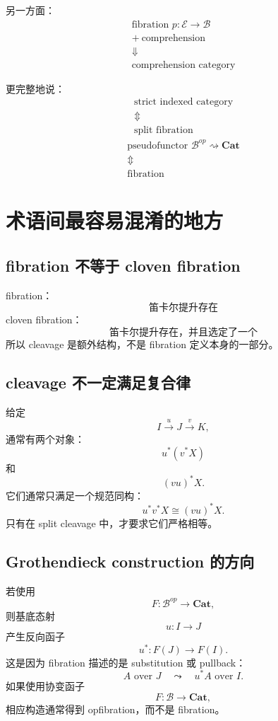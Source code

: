 \documentclass[12pt,a4paper]{article}
\begin{document}
另一方面：
\[
\begin{array}{c}
\text{fibration }p:\mathcal{E}\to\mathcal{B}
\\[2mm]
+\ \text{comprehension}
\\[2mm]
\Downarrow
\\[2mm]
\text{comprehension category}
\end{array}
\]

更完整地说：
\[
\begin{array}{c}
\text{strict indexed category}
\\
\Updownarrow
\\
\text{split fibration}
\end{array}
\]
\[
\begin{array}{c}
\text{pseudofunctor }\mathcal{B}^{op}\rightsquigarrow\mathbf{Cat}
\\
\Updownarrow
\\
\text{fibration}
\end{array}
\]

\section{术语间最容易混淆的地方}

\subsection{fibration 不等于 cloven fibration}
fibration：
\[
\text{笛卡尔提升存在}
\]
cloven fibration：
\[
\text{笛卡尔提升存在，并且选定了一个}
\]
所以 cleavage 是额外结构，不是 fibration 定义本身的一部分。

\subsection{cleavage 不一定满足复合律}
给定
\[
I\xrightarrow{u}J\xrightarrow{v}K,
\]
通常有两个对象：
\[
u^*(v^*X)
\]
和
\[
(vu)^*X.
\]
它们通常只满足一个规范同构：
\[
u^*v^*X\cong(vu)^*X.
\]
只有在 split cleavage 中，才要求它们严格相等。

\subsection{Grothendieck construction 的方向}
若使用
\[
F:\mathcal{B}^{op}\to\mathbf{Cat},
\]
则基底态射
\[
u:I\to J
\]
产生反向函子
\[
u^*:F(J)\to F(I).
\]
这是因为 fibration 描述的是 substitution 或 pullback：
\[
A\text{ over }J
\quad\leadsto\quad
u^*A\text{ over }I.
\]
如果使用协变函子
\[
F:\mathcal{B}\to\mathbf{Cat},
\]
相应构造通常得到 opfibration，而不是 fibration。
\end{document}
